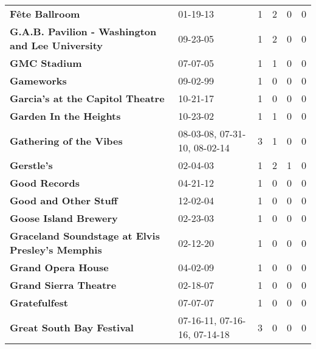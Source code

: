 \begin{supertabular}{llllll}
                                               \textbf{Fête Ballroom} &                      01-19-13 &  1 &   2 &  0 &  0 \\
             \textbf{G.A.B. Pavilion - Washington and Lee University} &                      09-23-05 &  1 &   2 &  0 &  0 \\
                                                 \textbf{GMC Stadium} &                      07-07-05 &  1 &   1 &  0 &  0 \\
                                                   \textbf{Gameworks} &                      09-02-99 &  1 &   0 &  0 &  0 \\
                             \textbf{Garcia’s at the Capitol Theatre} &                      10-21-17 &  1 &   0 &  0 &  0 \\
                                       \textbf{Garden In the Heights} &                      10-23-02 &  1 &   1 &  0 &  0 \\
                                      \textbf{Gathering of the Vibes} &  08-03-08, 07-31-10, 08-02-14 &  3 &   1 &  0 &  0 \\
                                                   \textbf{Gerstle's} &                      02-04-03 &  1 &   2 &  1 &  0 \\
                                                \textbf{Good Records} &                      04-21-12 &  1 &   0 &  0 &  0 \\
                                        \textbf{Good and Other Stuff} &                      12-02-04 &  1 &   0 &  0 &  0 \\
                                        \textbf{Goose Island Brewery} &                      02-23-03 &  1 &   0 &  0 &  0 \\
             \textbf{Graceland Soundstage at Elvis Presley’s Memphis} &                      02-12-20 &  1 &   0 &  0 &  0 \\
                                           \textbf{Grand Opera House} &                      04-02-09 &  1 &   0 &  0 &  0 \\
                                        \textbf{Grand Sierra Theatre} &                      02-18-07 &  1 &   0 &  0 &  0 \\
                                                \textbf{Gratefulfest} &                      07-07-07 &  1 &   0 &  0 &  0 \\
                                    \textbf{Great South Bay Festival} &  07-16-11, 07-16-16, 07-14-18 &  3 &   0 &  0 &  0 \\

\end{supertabular}
